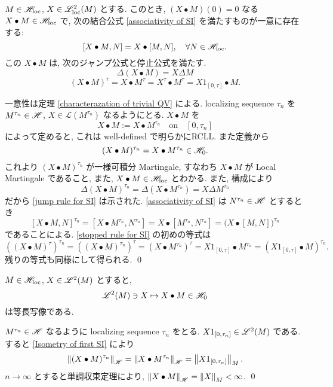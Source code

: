 \documentclass{ltjsarticle}
\begin{document}
\begin{thm} \label{construction of second SI}
	\( M \in \mathscr{H}_{\mathrm{loc}} \), \( X \in \mathscr{L}^2_{\mathrm{loc}}(M) \) とする.
	このとき, \( ( X \bullet M )(0) = 0 \) なる \( X \bullet M \in \mathscr{H}_{\mathrm{loc}} \) で, 次の結合公式 \eqref{associativity of SI} を満たすものが一意に存在する:
	\begin{equation} \label{associativity of SI}
		[ X \bullet M,N ] = X \bullet [ M,N ],\quad \forall N \in \mathscr{H}_{\mathrm{loc}}.
	\end{equation}
	この \( X \bullet M \) は, 次のジャンプ公式と停止公式を満たす.
	\begin{equation} \label{jump rule for SI}
		\Delta ( X \bullet M ) = X \Delta M
	\end{equation}
	\begin{equation} \label{stopped rule for SI}
		(X \bullet M)^{ \tau }	= X \bullet M^{ \tau }
		= X^{ \tau } \bullet M^{ \tau }
		= X1_{ [0,\tau] } \bullet M.
	\end{equation}
\end{thm}
\begin{prf}
	一意性は定理 \ref{characterazation of trivial QV} による.
	localizing sequence \( \tau_n \) を \( M^{ \tau_n } \in \mathscr{H} \), \( X \in \mathscr{L}(M^{ \tau_n }) \)
	なるようにとる.
	\( X \bullet M \) を
	\[
		X \bullet M := X \bullet M^{ \tau_n }	\quad \text{on} \quad [0,\tau_n]
	\]
	によって定めると, これは well-defined で明らかにRCLL.
	また定義から
	\[
		( X \bullet M )^{\tau_n} = X \bullet M^{\tau_n} \in \mathscr{H}_0.
	\]
	これより \( ( X \bullet M )^{\tau_n} \) が一様可積分 Martingale, すなわち \( X \bullet M \) が
	Local Martingale であること, また, \( X \bullet M \in \mathscr{H}_{\mathrm{loc}} \) とわかる.
	また, 構成により
	\[
		\Delta ( X \bullet M )^{\tau_n}	= \Delta ( X \bullet M^{\tau_n} )
		= X \Delta M^{\tau_n}
	\]
	だから \eqref{jump rule for SI} は示された. \eqref{associativity of SI} は \( N^{ \tau_n } \in \mathscr{H} \) とするとき
	\[
		[ X \bullet M, N ]^{ \tau_n }	=	[ X \bullet M^{ \tau_n }, N^{ \tau_n } ]
		=	X \bullet [ M^{ \tau_n }, N^{ \tau_n } ]
		=	\big( X \bullet [ M, N ] \big)^{ \tau_n }
	\]
	であることによる.
	\eqref{stopped rule for SI} の初めの等式は
	\[
		\left( \left( X \bullet M \right)^{ \tau } \right)^{ \tau_n }
		= 	\left( \left( X \bullet M \right)^{ \tau_n } \right)^{ \tau }
		=	\left( X \bullet M^{ \tau_n } \right)^{ \tau }
		=	X1_{ [0, \tau ] } \bullet M^{ \tau_n }
		=	\left( X1_{ [0, \tau ] } \bullet M \right)^{ \tau_n }.
	\]
	残りの等式も同様にして得られる.
	\qed\end{prf}

\begin{thm}	\label{Isom2}
	\( M \in \mathscr{H}_{\mathrm{loc}} \), \( X \in \mathscr{L}^2 (M) \) とすると,
	\[
		\mathscr{L}^2 (M) \ni X \mapsto X \bullet M \in \mathscr{H}_0
	\]
	は等長写像である.
\end{thm}
\begin{prf}
	\( M^{\tau_n} \in \mathscr{H} \) なるように localizing sequence \( \tau_n \) をとる.
	\( X1_{ [0, \tau_n ] } \in \mathscr{L}^2 (M) \) である.
	すると \eqref{Isometry of first SI} により
	\[
		\left\| ( X \bullet M )^{ \tau_n } \right\|_{\mathscr{H}}	=	\left\|  X \bullet M^{ \tau_n } \right\|_{\mathscr{H}}
		=	
		\left\|  X1_{ [0, \tau_n ] } \right\|_{M}.
	\]
	\( n \to \infty \) とすると単調収束定理により, \( \left\|  X \bullet M  \right\|_{\mathscr{H}} = 
	\left\| X \right\|_{M} < \infty \).
	\qed\end{prf}
\end{document}

